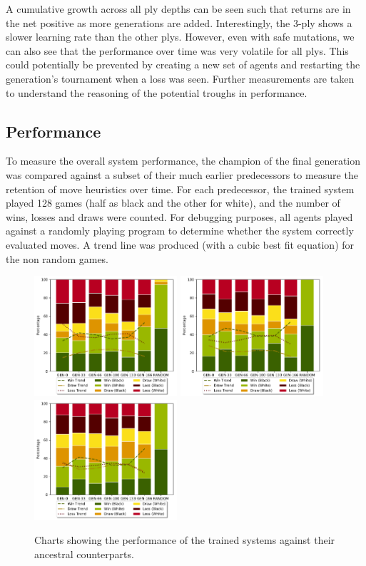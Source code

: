 \documentclass[12pt,a4paper]{article}
\begin{document}
    A cumulative growth across all ply depths can be seen such that returns are in the net positive as more generations are added. Interestingly, the 3-ply shows a slower learning rate than the other plys. However, even with safe mutations, we can also see that the performance over time was very volatile for all plys. This could potentially be prevented by creating a new set of agents and restarting the generation's tournament when a loss was seen. Further measurements are taken to understand the reasoning of the potential troughs in performance. 
    
    \subsection{Performance}
    To measure the overall system performance, the champion of the final generation was compared against a subset of their much earlier predecessors to measure the retention of move heuristics over time. For each predecessor, the trained system played 128 games (half as black and the other for white), and the number of wins, losses and draws were counted. For debugging purposes, all agents played against a randomly playing program to determine whether the system correctly evaluated moves. A trend line was produced (with a cubic best fit equation) for the non random games.
    \begin{figure}[!ht]
        \centering
        \includegraphics[width=53mm]{images/results/1ply/gm_net_stats.pdf}
        \includegraphics[width=53mm]{images/results/3ply/gm_net_stats.pdf}
        \includegraphics[width=53mm]{images/results/6ply/gm_net_stats.pdf}
        \caption{Charts showing the performance of the trained systems against their ancestral counterparts.\label{net_stats}}
    \end{figure}
    
\end{document}
